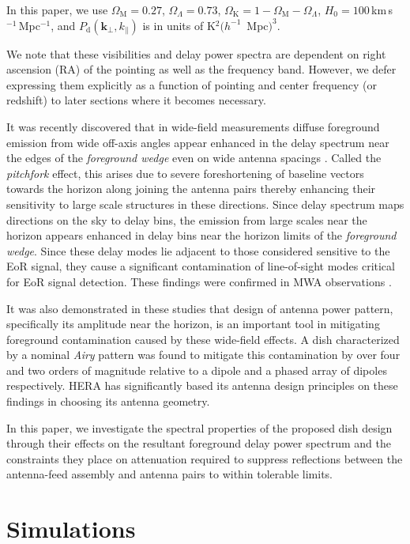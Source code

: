 \documentclass[preprint2,iop,numberedappendix,twocolappendix,appendixfloats]{emulateapj}
\begin{document}
In this paper, we use $\Omega_\textrm{M}=0.27$, $\Omega_\Lambda=0.73$, $\Omega_\textrm{K}=1-\Omega_\textrm{M}-\Omega_\Lambda$, $H_0=100\,$km$\,$s$^{-1}\,$Mpc$^{-1}$, and $P_\textrm{d}(\boldsymbol{k}_\perp,k_\parallel)$ is in units of K$^2 (h^{-1}$~Mpc$)^3$.

We note that these visibilities and delay power spectra are dependent on right ascension (RA) of the pointing as well as the frequency band. However, we defer expressing them explicitly as a function of pointing and center frequency (or redshift) to later sections where it becomes necessary.

It was recently discovered that in wide-field measurements diffuse foreground emission from wide off-axis angles appear enhanced in the delay spectrum near the edges of the {\it foreground wedge} even on wide antenna spacings \citep{thy15a}. Called the {\it pitchfork} effect, this arises due to severe foreshortening of baseline vectors towards the horizon along joining the antenna pairs thereby enhancing their sensitivity to large scale structures in these directions. Since delay spectrum maps directions on the sky to delay bins, the emission from large scales near the horizon appears enhanced in delay bins near the horizon limits of the {\it foreground wedge}. Since these delay modes lie adjacent to those considered sensitive to the EoR signal, they cause a significant contamination of line-of-sight modes critical for EoR signal detection. These findings were confirmed in MWA observations \citep{thy15b}.

It was also demonstrated in these studies that design of antenna power pattern, specifically its amplitude near the horizon, is an important tool in mitigating foreground contamination caused by these wide-field effects. A dish characterized by a nominal {\it Airy} pattern was found to mitigate this contamination by over four and two orders of magnitude relative to a dipole and a phased array of dipoles respectively. HERA has significantly based its antenna design principles on these findings in choosing its antenna geometry.

In this paper, we investigate the spectral properties of the proposed dish design through their effects on the resultant foreground delay power spectrum and the constraints they place on attenuation required to suppress reflections between the antenna-feed assembly and antenna pairs to within tolerable limits. 

\section{Simulations}\label{sec:sim}
\end{document}
